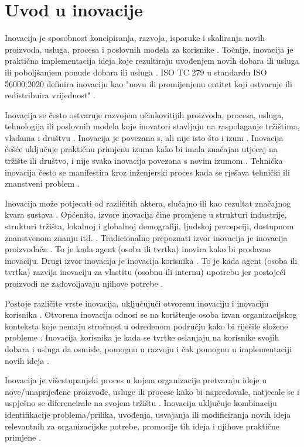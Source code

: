 \chapter{Uvod u inovacije} \label{uvod_u_inovacije}

Inovacija je sposobnost koncipiranja, razvoja, isporuke i skaliranja novih
proizvoda, usluga, procesa i poslovnih modela za korisnike
\citep{mckinesyinnovation2022}. Točnije, inovacija je praktična implementacija
ideja koje rezultiraju uvođenjem novih dobara ili usluga ili poboljšanjem ponude
dobara ili usluga \citep{wikipediainnovation2023}. ISO TC 279 u standardu ISO
56000:2020 definira inovaciju kao "novu ili promijenjenu entitet koji ostvaruje
ili redistribuira vrijednost" \citep{wikipediainnovation2023}.

Inovacija se često ostvaruje razvojem učinkovitijih proizvoda, procesa, usluga,
tehnologija ili poslovnih modela koje inovatori stavljaju na raspolaganje
tržištima, vladama i društvu \citep{wikipediainnovation2023}. Inovacija je
povezana s, ali nije isto što i izum \citep{wikipediainnovation2023}. Inovacija
češće uključuje praktičnu primjenu izuma kako bi imala značajan utjecaj na
tržište ili društvo, i nije svaka inovacija povezana s novim izumom
\citep{wikipediainnovation2023}. Tehnička inovacija često se manifestira kroz
inženjerski proces kada se rješava tehnički ili znanstveni problem
\citep{wikipediainnovation2023}.

Inovacija može potjecati od različitih aktera, slučajno ili kao rezultat
značajnog kvara sustava \citep{wikipediainnovation2023}. Općenito, izvore
inovacija čine promjene u strukturi industrije, strukturi tržišta, lokalnoj i
globalnoj demografiji, ljudskoj percepciji, dostupnom znanstvenom znanju itd.
\citep{wikipediainnovation2023}. Tradicionalno prepoznati izvor inovacija je
inovacija proizvođača \citep{wikipediainnovation2023}. To je kada agent (osoba
ili tvrtka) inovira kako bi prodavao inovaciju. Drugi izvor inovacija je
inovacija korisnika \citep{wikipediainnovation2023}. To je kada agent (osoba ili
tvrtka) razvija inovaciju za vlastitu (osobnu ili internu) upotrebu jer
postojeći proizvodi ne zadovoljavaju njihove potrebe
\citep{wikipediainnovation2023}.

Postoje različite vrste inovacija, uključujući otvorenu inovaciju i inovaciju
korisnika \citep{wikipediainnovation2023}. Otvorena inovacija odnosi se na
korištenje osoba izvan organizacijskog konteksta koje nemaju stručnost u
određenom području kako bi riješile složene probleme
\citep{wikipediainnovation2023}. Inovacija korisnika je kada se tvrtke oslanjaju
na korisnike svojih dobara i usluga da osmisle, pomognu u razvoju i čak pomognu
u implementaciji novih ideja \citep{wikipediainnovation2023}.

Inovacija je višestupanjski proces u kojem organizacije pretvaraju ideje u
nove/unaprijeđene proizvode, usluge ili procese kako bi napredovale, natjecale
se i uspješno se diferencirale na svojem tržištu
\citep{wikipediainnovation2023}. Inovacija uključuje kombinaciju identifikacije
problema/prilika, uvođenja, usvajanja ili modificiranja novih ideja relevantnih
za organizacijske potrebe, promocije tih ideja i njihove praktične primjene
\citep{wikipediainnovation2023}.